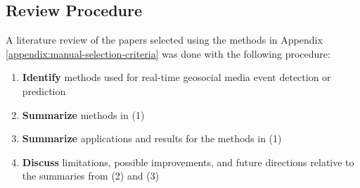 \subsection{Review Procedure} \label{appendix:review-procedure}

A literature review of the papers selected using the methods in Appendix \ref{appendix:manual-selection-criteria} was done with the following procedure:

\begin{enumerate}
	\item \textbf{Identify} methods used for real-time geosocial media event detection or prediction
	\item \textbf{Summarize} methods in (1)
	\item \textbf{Summarize} applications and results for the methods in (1)
	\item \textbf{Discuss} limitations, possible improvements, and future directions relative to the summaries from (2) and (3)
\end{enumerate}

